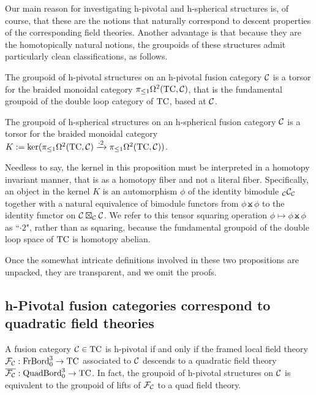 \documentclass{amsart}
\begin{document}
Our main reason for investigating h-pivotal and h-spherical structures is, of course, that these are the notions that naturally correspond to descent properties of the corresponding field theories.  Another advantage is that because they are the homotopically natural notions, the groupoids of these structures admit particularly clean classifications, as follows.

\begin{proposition}
The groupoid of h-pivotal structures on an h-pivotal fusion category $\mathcal C$ is a torsor for the braided monoidal category $\pi_{\leq 1} \Omega^2(\mathrm{TC},\mathcal C)$, that is the fundamental groupoid of the double loop category of $\mathrm{TC}$, based at $\mathcal C$.
\end{proposition}

\begin{proposition}
The groupoid of h-spherical structures on an h-spherical fusion category $\mathcal C$ is a torsor for the braided monoidal category $K := \ker(\pi_{\leq 1} \Omega^2(\mathrm{TC},\mathcal C) \xrightarrow{\cdot 2} \pi_{\leq 1} \Omega^2(\mathrm{TC},\mathcal C))$.
\end{proposition}

Needless to say, the kernel in this proposition must be interpreted in a homotopy invariant manner, that is as a homotopy fiber and not a literal fiber.  Specifically, an object in the kernel $K$ is an automorphism $\phi$ of the identity bimodule ${}_{\mathcal C} {\mathcal C}_{\mathcal C}$ together with a natural equivalence of bimodule functors from $\phi \btimes \phi$ to the identity functor on $\mathcal C \boxtimes_{\mathcal C} \mathcal C$.  We refer to this tensor squaring operation $\phi \mapsto \phi \btimes \phi$ as ``$\cdot 2$", rather than as squaring, because the fundamental groupoid of the double loop space of $\mathrm{TC}$ is homotopy abelian.

Once the somewhat intricate definitions involved in these two propositions are unpacked, they are transparent, and we omit the proofs. 

\subsection{h-Pivotal fusion categories correspond to quadratic field theories} \label{sec-pivot-orpo}

\begin{theorem}
A fusion category $\mathcal C \in \mathrm{TC}$ is h-pivotal if and only if the framed local field theory $\mathcal F_{\mathcal C} : \mathrm{FrBord}_0^3 \rightarrow \mathrm{TC}$ associated to $\mathcal C$ descends to a quadratic field theory $\overline{\mathcal F_{\mathcal C}} : \mathrm{QuadBord}_0^3 \rightarrow \mathrm{TC}$.  In fact, the groupoid of h-pivotal structures on $\mathcal C$ is equivalent to the groupoid of lifts of $\mathcal F_{\mathcal C}$ to a quad field theory.
\end{theorem}
\end{document}

